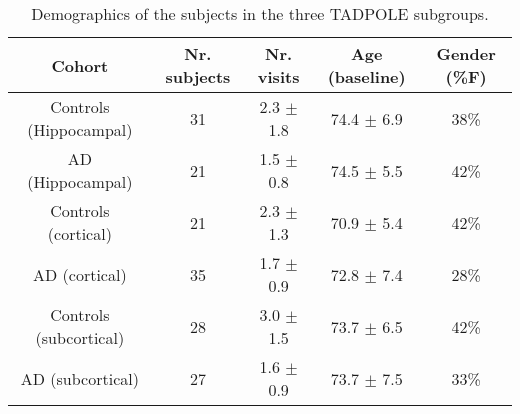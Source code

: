 \documentclass{llncs}
\begin{document}
\begin{table}
 \begin{tabular}{c | c c c c}
\textbf{Cohort} & \textbf{Nr. subjects} & \textbf{Nr. visits} & \textbf{Age (baseline)} & \textbf{Gender (\%F)}\\
\hline
Controls (Hippocampal) & 31 & 2.3 $\pm$ 1.8 & 74.4 $\pm$ 6.9 & 38\%\\
AD (Hippocampal) & 21 & 1.5 $\pm$ 0.8 & 74.5 $\pm$ 5.5 & 42\%\\
\hline
Controls (cortical) & 21 & 2.3 $\pm$ 1.3 & 70.9 $\pm$ 5.4 & 42\%\\
AD (cortical) & 35 & 1.7 $\pm$ 0.9 & 72.8 $\pm$ 7.4 & 28\%\\
\hline
Controls (subcortical) & 28 & 3.0 $\pm$ 1.5 & 73.7 $\pm$ 6.5 & 42\%\\
AD (subcortical) & 27 & 1.6 $\pm$ 0.9 & 73.7 $\pm$ 7.5 & 33\%\\
 \end{tabular}
 \caption{Demographics of the subjects in the three TADPOLE subgroups.}
 \label{tab:demogTadSubtypes}
\end{table}


% 
% 
% 
\end{document}
